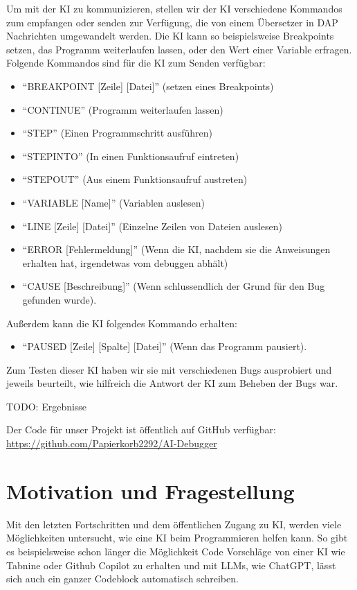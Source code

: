 \documentclass[a4paper,12pt,ngerman]{scrartcl}
\begin{document}
Um mit der KI zu kommunizieren, stellen wir der KI verschiedene Kommandos zum empfangen oder senden zur Verfügung, die von einem Übersetzer in DAP Nachrichten umgewandelt werden. Die KI kann so beispielsweise Breakpoints setzen, das Programm weiterlaufen lassen, oder den Wert einer Variable erfragen. Folgende Kommandos sind für die KI zum Senden verfügbar:
\begin{itemize}
	\item ``BREAKPOINT [Zeile] [Datei]'' (setzen eines Breakpoints)
	\item ``CONTINUE'' (Programm weiterlaufen lassen)
	\item ``STEP'' (Einen Programmschritt ausführen)
	\item ``STEPINTO'' (In einen Funktionsaufruf eintreten)
	\item ``STEPOUT'' (Aus einem Funktionsaufruf austreten)
	\item ``VARIABLE [Name]'' (Variablen auslesen)
	\item ``LINE [Zeile] [Datei]'' (Einzelne Zeilen von Dateien auslesen)
	\item ``ERROR [Fehlermeldung]'' (Wenn die KI, nachdem sie die Anweisungen erhalten hat, irgendetwas vom debuggen abhält)
	\item ``CAUSE [Beschreibung]'' (Wenn schlussendlich der Grund für den Bug gefunden wurde).
\end{itemize}
Außerdem kann die KI folgendes Kommando erhalten:
\begin{itemize}
	\item ``PAUSED [Zeile] [Spalte] [Datei]'' (Wenn das Programm pausiert).
\end{itemize}

Zum Testen dieser KI haben wir sie mit verschiedenen Bugs ausprobiert und jeweils beurteilt, wie hilfreich die Antwort der KI zum Beheben der Bugs war.

TODO: Ergebnisse

Der Code für unser Projekt ist öffentlich auf GitHub verfügbar: \url{https://github.com/Papierkorb2292/AI-Debugger}

\section{Motivation und Fragestellung}

Mit den letzten Fortschritten und dem öffentlichen Zugang zu KI, werden viele Möglichkeiten untersucht, wie eine KI beim Programmieren helfen kann. So gibt es beispielsweise schon länger die Möglichkeit Code Vorschläge von einer KI wie Tabnine oder Github Copilot zu erhalten und mit LLMs, wie ChatGPT, lässt sich auch ein ganzer Codeblock automatisch schreiben.
\end{document}
